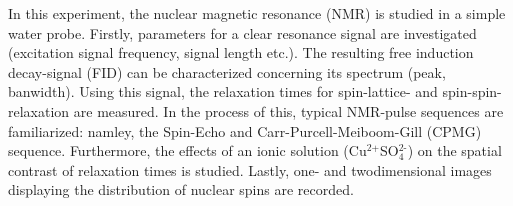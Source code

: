 \documentclass[../main.tex]{subfiles}
\begin{document}

In this experiment, the nuclear magnetic resonance (NMR) is studied in a simple water probe. Firstly, parameters for a clear resonance signal are investigated (excitation signal frequency, signal length etc.). The resulting free induction decay-signal (FID) can be characterized concerning its spectrum (peak, banwidth). Using this signal, the relaxation times for spin-lattice- and spin-spin-relaxation are measured. In the process of this, typical NMR-pulse sequences are familiarized: namley, the Spin-Echo and Carr-Purcell-Meiboom-Gill (CPMG) sequence. Furthermore, the effects of an ionic solution (Cu$^\text{2+}$SO$_\text{4}^\text{2-}$) on the spatial contrast of relaxation times is studied. Lastly, one- and twodimensional images displaying the distribution of nuclear spins are recorded.
\end{document}

